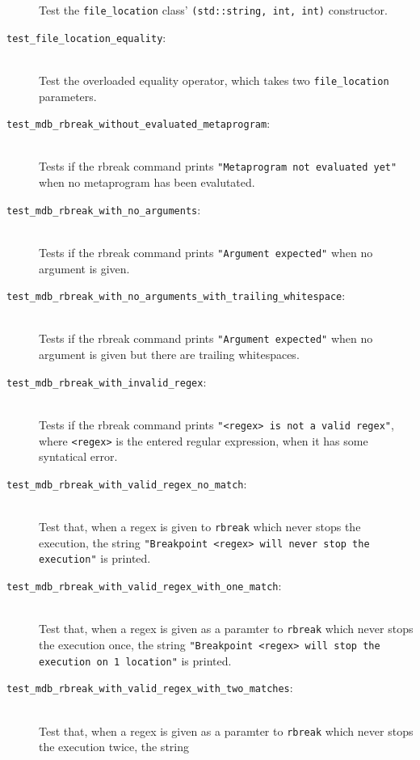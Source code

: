 \begin{description}
        Test the \texttt{file\_location} class'
        \texttt{(std::string, int, int)} constructor.
    \item[\texttt{test\_file\_location\_equality}:] \hfill \\
        Test the overloaded equality operator, which takes two
        \texttt{file\_location} parameters.
    \item[\texttt{test\_mdb\_rbreak\_without\_evaluated\_metaprogram}:] \hfill \\
        Tests if the rbreak command prints
        \texttt{"Metaprogram not evaluated yet"} when no metaprogram has been
        evalutated.
    \item[\texttt{test\_mdb\_rbreak\_with\_no\_arguments}:] \hfill \\
        Tests if the rbreak command prints
        \texttt{"Argument expected"} when no argument is given.
    \item[\texttt{test\_mdb\_rbreak\_with\_no\_arguments\_with\_trailing\_whitespace}:] \hfill \\
        Tests if the rbreak command prints
        \texttt{"Argument expected"} when no argument is given but there are
        trailing whitespaces.
    \item[\texttt{test\_mdb\_rbreak\_with\_invalid\_regex}:] \hfill \\
        Tests if the rbreak command prints
        \texttt{"<regex> is not a valid regex"}, where \texttt{<regex>} is the
        entered regular expression, when it has some syntatical error.
    \item[\texttt{test\_mdb\_rbreak\_with\_valid\_regex\_no\_match}:] \hfill \\
        Test that, when a regex is given to \texttt{rbreak} which never stops
        the execution, the string
        \texttt{"Breakpoint <regex> will never stop the execution"} is
        printed.
    \item[\texttt{test\_mdb\_rbreak\_with\_valid\_regex\_with\_one\_match}:] \hfill \\
        Test that, when a regex is given as a paramter to \texttt{rbreak} which
        never stops the execution once, the string
        \texttt{"Breakpoint <regex> will stop the execution on 1 location"} is
        printed.
    \item[\texttt{test\_mdb\_rbreak\_with\_valid\_regex\_with\_two\_matches}:] \hfill \\
        Test that, when a regex is given as a paramter to \texttt{rbreak} which
        never stops the execution twice, the string

\end{description}
